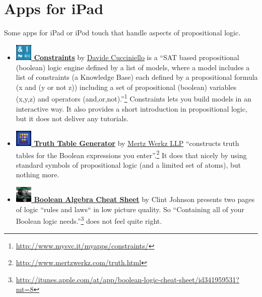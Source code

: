 \section{Apps for iPad}
 
Some apps for iPad or iPod touch that handle aspects of propositional logic.

\begin{itemize}

\item  \href{http://itunes.apple.com/at/app/constraints/id418722652?mt=8}{\bf 
\includegraphics[width=0.8cm]{related/Constraints.png} Constraints}
by 
\href{http://www.mysvc.it/myapps/constraints/}{Davide Cucciniello} 
is a “SAT based propositional (boolean) logic engine defined by a list of models, 
where a model includes a list of constraints (a Knowledge Base) 
each defined by a propositional formula (x and (y or not z)) 
including a set of propositional (boolean) variables (x,y,z) 
and operators (and,or,not).”\footnote{
\url{http://www.mysvc.it/myapps/constraints/}} Constraints
lets you build models in an interactive way. 
It also provides a short introduction in propositional logic, 
but it does not deliver any tutorials.


\item \href{http://itunes.apple.com/at/app/truth-table-generator/id507190346?mt=8}{\bf 
\includegraphics[width=0.8cm]{related/TruthTables.png} Truth Table Generator} 
by
\href{http://www.mertzwerkz.com/truth.html}{Mertz Werkz LLP}    
“constructs truth tables for the Boolean expressions you enter”.\footnote{
\url{http://www.mertzwerkz.com/truth.html}}
It does that nicely by using standard symbols of propositional logic (and a limited set of atoms), but nothing more.

\item
\href{http://itunes.apple.com/at/app/boolean-logic-cheat-sheet/id341959531?mt=8}{\bf 
\includegraphics[width=0.8cm]{related/CheatSheet.png} Boolean Algebra Cheat Sheet} 
by 
{Clint Johnson} presents two pages of logic “rules and laws“ in low picture quality. So “Containing all of your Boolean 
logic needs.”\footnote{
\url{http://itunes.apple.com/at/app/boolean-logic-cheat-sheet/id341959531?mt=8}} 
does not feel quite right.


\end{itemize}
